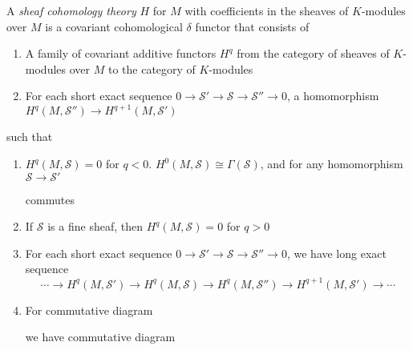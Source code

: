 \documentclass[main]{subfiles}
\begin{document}
\begin{definition}
A \textit{sheaf cohomology theory} $H$ for $M$ with coefficients in the sheaves of $K$-modules over $M$ is a covariant cohomological $\delta$ functor that consists of
\begin{enumerate}[leftmargin=*]
\item A family of covariant additive functors $H^q$ from the category of sheaves of $K$-modules over $M$ to the category of $K$-modules
\item For each short exact sequence $0\to\mathcal S'\to\mathcal S\to\mathcal S''\to0$, a homomorphism $H^q(M,\mathcal S'')\to H^{q+1}(M,\mathcal S')$
\end{enumerate}
such that
\begin{enumerate}[leftmargin=*]
\item $H^q(M,\mathcal S)=0$ for $q<0$. $H^0(M,\mathcal S)\cong\Gamma(\mathcal S)$, and for any homomorphism $\mathcal S\to\mathcal S'$
\begin{center}
\end{center} 
commutes
\item If $\mathcal S$ is a fine sheaf, then $H^q(M,\mathcal S)=0$ for $q>0$
\item For each short exact sequence $0\to\mathcal S'\to\mathcal S\to\mathcal S''\to0$, we have long exact sequence
\[\cdots\to H^q(M,\mathcal S')\to H^q(M,\mathcal S)\to H^q(M,\mathcal S'')\to H^{q+1}(M,\mathcal S')\to\cdots\]
\item For commutative diagram
\begin{center}
\end{center}
we have commutative diagram
\begin{center}
\end{center}
\end{enumerate}
\end{definition}
\end{document}
